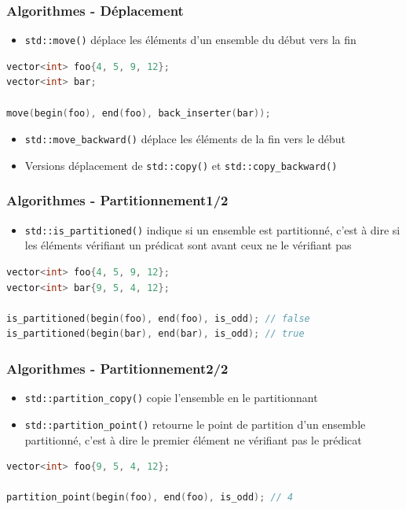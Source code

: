 \documentclass[C++.tex]{subfiles}
\begin{document}
\begin{frame}[fragile]
	\frametitle{Algorithmes - Déplacement}
	\begin{itemize}
		\item \lstinline|std::move()| déplace les éléments d'un ensemble du début vers la fin
	\end{itemize}

	\begin{lstlisting}[language=C++]
vector<int> foo{4, 5, 9, 12};
vector<int> bar;

move(begin(foo), end(foo), back_inserter(bar));\end{lstlisting}

	\begin{itemize}
		\item \lstinline|std::move_backward()| déplace les éléments de la fin vers le début
		\item Versions \og déplacement\fg{} de \lstinline|std::copy()| et \lstinline|std::copy_backward()|
	\end{itemize}
\end{frame}

\begin{frame}[fragile]
	\frametitle{Algorithmes - Partitionnement\titlehfill{}1/2}
	\begin{itemize}
		\item \lstinline|std::is_partitioned()| indique si un ensemble est partitionné, c'est à dire si les éléments vérifiant un prédicat sont avant ceux ne le vérifiant pas
	\end{itemize}

	\begin{lstlisting}[language=C++]
vector<int> foo{4, 5, 9, 12};
vector<int> bar{9, 5, 4, 12};

is_partitioned(begin(foo), end(foo), is_odd); // false
is_partitioned(begin(bar), end(bar), is_odd); // true\end{lstlisting}
\end{frame}

\begin{frame}[fragile]
	\frametitle{Algorithmes - Partitionnement\titlehfill{}2/2}
	\begin{itemize}
		\item \lstinline|std::partition_copy()| copie l'ensemble en le partitionnant
		\item \lstinline|std::partition_point()| retourne le point de partition d'un ensemble partitionné, c'est à dire le premier élément ne vérifiant pas le prédicat
	\end{itemize}

	\begin{lstlisting}[language=C++]
vector<int> foo{9, 5, 4, 12};

partition_point(begin(foo), end(foo), is_odd); // 4\end{lstlisting}
\end{frame}
\end{document}
